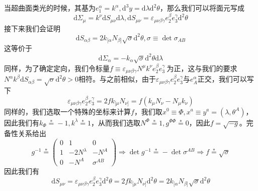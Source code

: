 \documentclass[hyperref, UTF8, a4paper]{ctexart}
\begin{document}
当超曲面类光的时候，其基为$e_{1}^{\alpha } =k^{\alpha } ,\mathrm{d}^{3} y=\mathrm{d} \lambda \mathrm{d}^{2} \theta $，那么我们可以将面元写成
\begin{equation*}
	\mathrm{d} \Sigma _{\mu } =k^{\nu }\mathrm{d} S_{\mu \nu }\mathrm{d} \lambda ,\mathrm{d} S_{\mu \nu } =\varepsilon _{\mu \nu \beta \gamma } e_{2}^{\beta } e_{3}^{\gamma }\mathrm{d}^{2} \theta 
\end{equation*}
接下来我们会证明
\begin{equation*}
	\mathrm{d} S_{\alpha \beta } =2k_{[ \alpha } N_{\beta ]}\sqrt{\sigma }\mathrm{d}^{2} \theta ,\sigma \equiv \det \sigma _{AB}
\end{equation*}
这等价于
\begin{equation*}
	\mathrm{d} \Sigma _{\alpha } =-k_{\alpha }\sqrt{\sigma }\mathrm{d}^{2} \theta \mathrm{d} \lambda 
\end{equation*}
同样，为了确定定向，我们令标量$f\equiv \varepsilon _{\mu \nu \beta \gamma } N^{\mu } k^{\nu } e_{2}^{\beta } e_{3}^{\gamma } \ $为正，这与我们的要求$N^{\alpha } k^{\beta }\mathrm{d} S_{\alpha \beta } =\sqrt{\sigma }\mathrm{d}^{2} \theta  >0$相符。与之前相似，由于$\varepsilon _{\mu \nu \beta \gamma } e_{2}^{\beta } e_{3}^{\gamma }$与$e_{A}^{\alpha }$正交，我们可以写下
\begin{equation*}
	\varepsilon _{\mu \nu \beta \gamma } e_{2}^{\beta } e_{3}^{\gamma } =2fk_{[ \mu } N_{\nu ]} =f( k_{\mu } N_{\nu } -N_{\mu } k_{\nu })
\end{equation*}
同样的，我们选取一个特殊的坐标来计算$f$，我们取$x^{0} \equiv \Phi ,x^{a} \equiv y^{a} =(\lambda ,\theta ^{A} )$，因此我们有$k_{\Phi }\stackrel{*}{=} -1,k^{\lambda }\stackrel{*}{=} 1$，从而我们选取$N^{\Phi }\stackrel{*}{=} 1,g^{\Phi \Phi }\stackrel{*}{=} 0$，因此$f=\sqrt{-g}$。完备性关系给出
\begin{equation*}
	g^{-1}\stackrel{*}{=}\begin{pmatrix}
		0 & 1 & 0\\
		1 & -2N^{\lambda } & -N^{A}\\
		0 & -N^{A} & \sigma ^{AB}
	\end{pmatrix} \Rightarrow \det g^{-1}\stackrel{*}{=} -\det \sigma ^{AB} \Rightarrow f\stackrel{*}{=}\sqrt{\sigma }
\end{equation*}
因此我们有
\begin{equation*}
	\mathrm{d} S_{\mu \nu } =\varepsilon _{\mu \nu \beta \gamma } e_{2}^{\beta } e_{3}^{\gamma }\mathrm{d}^{2} \theta =2fk_{[ \mu } N_{\nu ]}\mathrm{d}^{2} \theta =2k_{[ \alpha } N_{\beta ]}\sqrt{\sigma }\mathrm{d}^{2} \theta 
\end{equation*}
\end{document}
